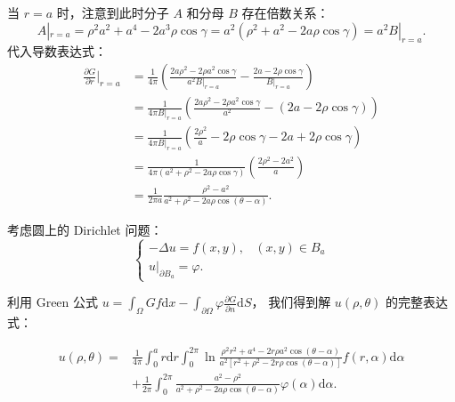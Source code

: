 \documentclass[12pt,a4paper]{ctexart}
\begin{document}
	当 $r=a$ 时，注意到此时分子 $A$ 和分母 $B$ 存在倍数关系：
	\[
	A|_{r=a} = \rho^2 a^2 + a^4 - 2a^3 \rho \cos\gamma = a^2 (\rho^2 + a^2 - 2a\rho \cos\gamma) = a^2 B|_{r=a}.
	\]
	代入导数表达式：
	\[
	\begin{aligned}
		\frac{\partial G}{\partial r} \bigg|_{r=a} &= \frac{1}{4\pi} \left( \frac{2a\rho^2 - 2\rho a^2 \cos\gamma}{a^2 B|_{r=a}} - \frac{2a - 2\rho \cos\gamma}{B|_{r=a}} \right) \\
		&= \frac{1}{4\pi B|_{r=a}} \left( \frac{2a\rho^2 - 2\rho a^2 \cos\gamma}{a^2} - (2a - 2\rho \cos\gamma) \right) \\
		&= \frac{1}{4\pi B|_{r=a}} \left( \frac{2\rho^2}{a} - 2\rho \cos\gamma - 2a + 2\rho \cos\gamma \right) \\
		&= \frac{1}{4\pi (a^2 + \rho^2 - 2a\rho \cos\gamma)} \left( \frac{2\rho^2 - 2a^2}{a} \right) \\
		&= \frac{1}{2\pi a} \frac{\rho^2 - a^2}{a^2 + \rho^2 - 2a\rho \cos(\theta - \alpha)}.
	\end{aligned}
	\]
	
	考虑圆上的 Dirichlet 问题：
	\begin{equation}
		\begin{cases}
			-\Delta u = f(x,y), & (x,y) \in B_a \\
			u \big|_{\partial B_a} = \varphi.
		\end{cases} 
	\end{equation}
	
	利用 Green 公式 $u = \int_{\Omega} G f \mathrm{d}x - \int_{\partial \Omega} \varphi \frac{\partial G}{\partial n} \mathrm{d}S$，
	我们得到解 $u(\rho, \theta)$ 的完整表达式：
	
	\begin{equation}
		\begin{aligned}
			u(\rho, \theta) = & \frac{1}{4\pi} \int_0^a r \mathrm{d}r \int_0^{2\pi} \ln \frac{\rho^2 r^2 + a^4 - 2r\rho a^2 \cos(\theta-\alpha)}{a^2 [ r^2 + \rho^2 - 2r\rho \cos(\theta-\alpha) ]} f(r, \alpha) \mathrm{d}\alpha \\
			& + \frac{1}{2\pi} \int_0^{2\pi} \frac{a^2 - \rho^2}{a^2 + \rho^2 - 2a\rho \cos(\theta - \alpha)} \varphi(\alpha) \mathrm{d}\alpha.
		\end{aligned} 
	\end{equation}
	
\end{document}
